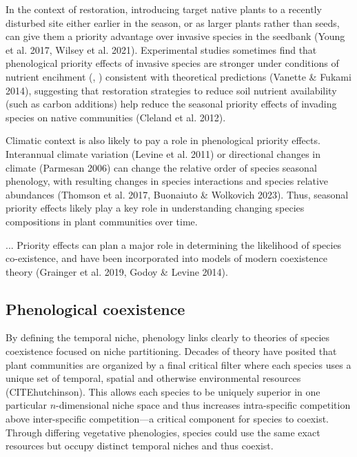 \documentclass[11pt]{article}
\begin{document}
In the context of restoration, introducing target native plants to a recently disturbed site either earlier in the season, or as larger plants rather than seeds, can give them a priority advantage over invasive species in the seedbank (Young et al. 2017, Wilsey et al. 2021). Experimental studies sometimes find that phenological priority effects of invasive species are stronger under conditions of nutrient encihment (\citet{kardol2013resource}, \citet{valliere2022phenological})  consistent with theoretical predictions (Vanette \& Fukami 2014), suggesting that restoration strategies to reduce soil nutrient availability (such as carbon additions) help reduce the seasonal priority effects of invading species on native communities (Cleland et al. 2012).

Climatic context is also likely to pay a role in phenological priority effects. Interannual climate variation (Levine et al. 2011) or directional changes in climate (Parmesan 2006) can change the relative order of species seasonal phenology, with resulting changes in species interactions and species relative abundances (Thomson et al. 2017, Buonaiuto \& Wolkovich 2023). Thus, seasonal priority effects likely play a key role in understanding changing species compositions in plant communities over time.

...
Priority effects can plan a major role in determining the likelihood of species co-existence, and have been incorporated into models of modern coexistence theory (Grainger et al. 2019, Godoy \& Levine 2014).

\subsection*{Phenological coexistence}

By defining the temporal niche, phenology links clearly to theories of species coexistence focused on niche partitioning. Decades of theory have posited that plant communities are organized by a final critical filter where each species uses a unique set of temporal, spatial and otherwise environmental resources (CITEhutchinson). This allows each species to be uniquely superior in one particular $n$-dimensional niche space and thus increases intra-specific competition above inter-specific competition---a critical component for species to coexist. Through differing vegetative phenologies, species could use the same exact resources but occupy distinct temporal niches and thus coexist. 
\end{document}
